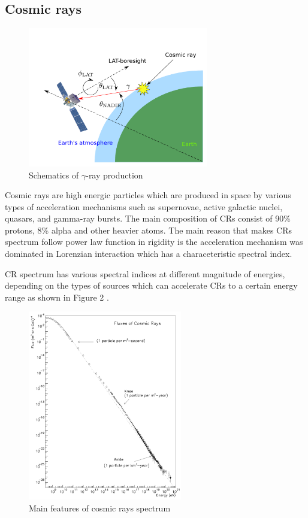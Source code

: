 \subsection{Cosmic rays}
\begin{figure}[h!]
    \centering
    \includegraphics[width=0.7\textwidth]{img/gamma_production_schematic}
    \caption{Schematics of $\gamma$-ray production}
\end{figure}
Cosmic rays are high energic particles which are produced in space by various types
of acceleration mechanisms such as supernovae, active galactic nuclei, quasars, and
gamma-ray bursts. The main composition of CRs consist of 90\% protons, 8\% alpha
and other heavier atoms. The main reason that makes CRs spectrum follow power
law function in rigidity is the acceleration mechanism was dominated in
Lorenzian interaction which has a characeteristic spectral index.

\par CR spectrum has various spectral indices at different magnitude of energies, depending on the types of sources which can accelerate CRs to a certain energy range as shown in Figure 2 \cite{Swordy2001}.
\begin{figure}[h!]
\centering
    \includegraphics[width=0.6\textwidth]{img/Swordy}
    \caption{Main features of cosmic rays spectrum}
\end{figure}

